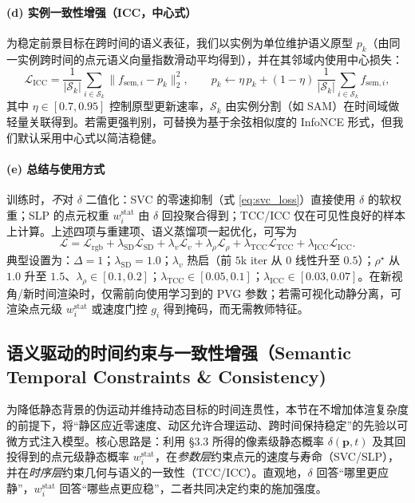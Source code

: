 \documentclass[10pt,conference]{IEEEtran} %
\begin{document}
\paragraph{(d) 实例一致性增强（ICC，中心式）}
为稳定前景目标在跨时间的语义表征，我们以实例为单位维护语义原型 $p_k$（由同一实例跨时间的点元语义向量指数滑动平均得到），并在其邻域内使用中心损失：
\begin{equation}
\mathcal L_{\mathrm{ICC}}
=\frac{1}{|\mathcal S_k|}\sum_{i\in\mathcal S_k}\big\|f_{\mathrm{sem},i}-p_k\big\|_2^2,
\qquad
p_k \leftarrow \eta\,p_k+(1-\eta)\,\frac{1}{|\mathcal S_k|}\!\sum_{i\in\mathcal S_k}\! f_{\mathrm{sem},i},
\label{eq:icc_center}
\end{equation}
其中 $\eta\in[0.7,0.95]$ 控制原型更新速率，$\mathcal S_k$ 由实例分割（如 SAM）在时间域做轻量关联得到。若需更强判别，可替换为基于余弦相似度的 InfoNCE 形式，但我们默认采用中心式以简洁稳健。

\paragraph{(e) 总结与使用方式}
训练时，\emph{不}对 $\delta$ 二值化：SVC 的零速抑制（式 \eqref{eq:svc_loss}）直接使用 $\delta$ 的软权重；SLP 的点元权重 $w_i^{\mathrm{stat}}$ 由 $\delta$ 回投聚合得到；TCC/ICC 仅在可见性良好的样本上计算。上述四项与重建项、语义蒸馏项一起优化，可写为
\begin{equation}
\mathcal L=\mathcal L_{\mathrm{rgb}}+\lambda_{\mathrm{SD}}\mathcal L_{\mathrm{SD}}
+\lambda_v \mathcal L_v+\lambda_\rho \mathcal L_\rho
+\lambda_{\mathrm{TCC}}\mathcal L_{\mathrm{TCC}}
+\lambda_{\mathrm{ICC}}\mathcal L_{\mathrm{ICC}}.
\label{eq:total_temporal}
\end{equation}
典型设置为：$\Delta{=}1$；$\lambda_{\mathrm{SD}}{=}1.0$；$\lambda_v$ 热启（前 $5$k iter 从 $0$ 线性升至 $0.5$）；$\rho^\star$ 从 $1.0$ 升至 $1.5$、$\lambda_\rho\in[0.1,0.2]$；$\lambda_{\mathrm{TCC}}\in[0.05,0.1]$；$\lambda_{\mathrm{ICC}}\in[0.03,0.07]$。在新视角/新时间渲染时，仅需前向使用学习到的 PVG 参数；若需可视化动静分离，可渲染点元级 $w_i^{\mathrm{stat}}$ 或速度门控 $g_i$ 得到掩码，而无需教师特征。


\subsection{语义驱动的时间约束与一致性增强（Semantic Temporal Constraints \& Consistency)}
为降低静态背景的伪运动并维持动态目标的时间连贯性，本节在不增加体渲复杂度的前提下，将“静区应近零速度、动区允许合理运动、跨时间保持稳定”的先验以可微方式注入模型。核心思路是：利用 §3.3 所得的像素级静态概率 $\delta(\mathbf p,t)$ 及其回投得到的点元级静态概率 $w_i^{\mathrm{stat}}$，在\emph{参数层}约束点元的速度与寿命（SVC/SLP），并在\emph{时序层}约束几何与语义的一致性（TCC/ICC）。直观地，$\delta$ 回答“哪里更应静”，$w_i^{\mathrm{stat}}$ 回答“哪些点更应稳”，二者共同决定约束的施加强度。
\end{document}
